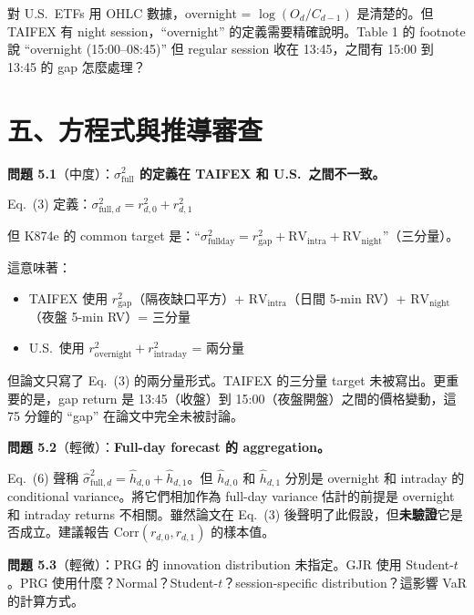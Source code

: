 \documentclass[12pt,a4paper]{article}
\begin{document}
對 U.S.\ ETFs 用 OHLC 數據，overnight = $\log(O_d / C_{d-1})$ 是清楚的。但 TAIFEX 有 night session，``overnight'' 的定義需要精確說明。Table 1 的 footnote 說 ``overnight (15:00--08:45)'' 但 regular session 收在 13:45，之間有 15:00 到 13:45 的 gap 怎麼處理？


\section{五、方程式與推導審查}

\textbf{問題 5.1}（\textcolor{warncolor}{中度}）：\textbf{$\sigma^2_\text{full}$ 的定義在 TAIFEX 和 U.S.\ 之間不一致。}

Eq.\ (3) 定義：$\sigma^2_{\text{full},d} = r^2_{d,0} + r^2_{d,1}$

但 K874e 的 common target 是：``$\sigma^2_\text{fullday} = r^2_\text{gap} + \text{RV}_\text{intra} + \text{RV}_\text{night}$''（三分量）。

這意味著：
\begin{itemize}
    \item TAIFEX 使用 $r^2_\text{gap}$（隔夜缺口平方）+ $\text{RV}_\text{intra}$（日間 5-min RV）+ $\text{RV}_\text{night}$（夜盤 5-min RV）= 三分量
    \item U.S.\ 使用 $r^2_\text{overnight} + r^2_\text{intraday}$ = 兩分量
\end{itemize}

但論文只寫了 Eq.\ (3) 的兩分量形式。TAIFEX 的三分量 target 未被寫出。更重要的是，gap return 是 13:45（收盤）到 15:00（夜盤開盤）之間的價格變動，這 75 分鐘的 ``gap'' 在論文中完全未被討論。

\textbf{問題 5.2}（輕微）：\textbf{Full-day forecast 的 aggregation。}

Eq.\ (6) 聲稱 $\hat{\sigma}^2_{\text{full},d} = \hat{h}_{d,0} + \hat{h}_{d,1}$。但 $\hat{h}_{d,0}$ 和 $\hat{h}_{d,1}$ 分別是 overnight 和 intraday 的 conditional variance。將它們相加作為 full-day variance 估計的前提是 overnight 和 intraday returns 不相關。雖然論文在 Eq.\ (3) 後聲明了此假設，但\textbf{未驗證}它是否成立。建議報告 $\text{Corr}(r_{d,0}, r_{d,1})$ 的樣本值。

\textbf{問題 5.3}（輕微）：PRG 的 innovation distribution 未指定。GJR 使用 Student-$t$。PRG 使用什麼？Normal？Student-$t$？session-specific distribution？這影響 VaR 的計算方式。


\end{document}
